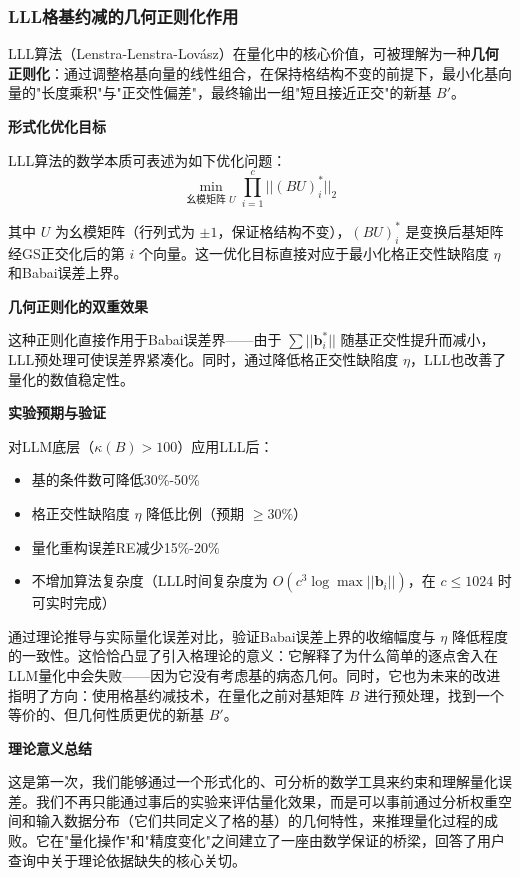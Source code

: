 \documentclass[letterpaper,twocolumn,10pt]{article}
\begin{document}
\subsubsection{LLL格基约减的几何正则化作用}

LLL算法（Lenstra-Lenstra-Lovász）在量化中的核心价值，可被理解为一种\textbf{几何正则化}：通过调整格基向量的线性组合，在保持格结构不变的前提下，最小化基向量的"长度乘积"与"正交性偏差"，最终输出一组"短且接近正交"的新基 $B'$。

\textbf{形式化优化目标}

LLL算法的数学本质可表述为如下优化问题：
$$\min_{\text{幺模矩阵 } U} \prod_{i=1}^c ||(BU)^*_i||_2$$

其中 $U$ 为幺模矩阵（行列式为 $\pm 1$，保证格结构不变），$(BU)^*_i$ 是变换后基矩阵经GS正交化后的第 $i$ 个向量。这一优化目标直接对应于最小化格正交性缺陷度 $\eta$ 和Babai误差上界。

\textbf{几何正则化的双重效果}

这种正则化直接作用于Babai误差界——由于 $\sum ||\mathbf{b}_i^*||$ 随基正交性提升而减小，LLL预处理可使误差界紧凑化。同时，通过降低格正交性缺陷度 $\eta$，LLL也改善了量化的数值稳定性。

\textbf{实验预期与验证}

对LLM底层（$\kappa(B) > 100$）应用LLL后：
\begin{itemize}
\item 基的条件数可降低30\%-50\%
\item 格正交性缺陷度 $\eta$ 降低比例（预期 $\geq 30\%$）
\item 量化重构误差RE减少15\%-20\%
\item 不增加算法复杂度（LLL时间复杂度为 $O(c^3 \log \max ||\mathbf{b}_i||)$，在 $c \leq 1024$ 时可实时完成）
\end{itemize}

通过理论推导与实际量化误差对比，验证Babai误差上界的收缩幅度与 $\eta$ 降低程度的一致性。这恰恰凸显了引入格理论的意义：它解释了为什么简单的逐点舍入在LLM量化中会失败——因为它没有考虑基的病态几何。同时，它也为未来的改进指明了方向：使用格基约减技术，在量化之前对基矩阵 $B$ 进行预处理，找到一个等价的、但几何性质更优的新基 $B'$。

\textbf{理论意义总结}

这是第一次，我们能够通过一个形式化的、可分析的数学工具来约束和理解量化误差。我们不再只能通过事后的实验来评估量化效果，而是可以事前通过分析权重空间和输入数据分布（它们共同定义了格的基）的几何特性，来推理量化过程的成败。它在"量化操作"和"精度变化"之间建立了一座由数学保证的桥梁，回答了用户查询中关于理论依据缺失的核心关切。
\end{document}
